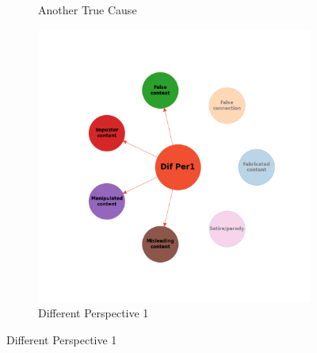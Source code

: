 \documentclass[twocolumn]{article}
\begin{document}
\begin{figure}
\begin{subfigure}{0.28\textwidth}
    \caption{Another True Cause}
    \label{fig:rebuttal_atc}
\end{subfigure}
\hfill
\begin{subfigure}{0.28\textwidth}
    \includegraphics[width=\textwidth]{rebuttal_Dif_Per1.png}
    \caption{Different Perspective 1}
    \label{fig:rebuttal_diffper1}
\end{subfigure}


\end{figure}
\end{document}
